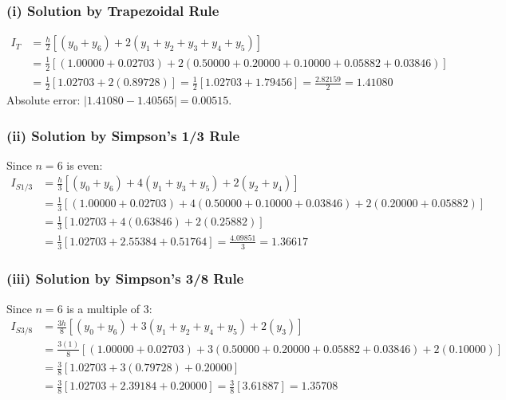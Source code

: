 \subsubsection*{(i) Solution by Trapezoidal Rule}
\begin{align}
    I_T &= \frac{h}{2} \left[ (y_0 + y_6) + 2(y_1 + y_2 + y_3 + y_4 + y_5) \right] \nonumber \\
    &= \frac{1}{2} \left[ (1.00000 + 0.02703) + 2(0.50000 + 0.20000 + 0.10000 + 0.05882 + 0.03846) \right] \nonumber \\
    &= \frac{1}{2} \left[ 1.02703 + 2(0.89728) \right] = \frac{1}{2} \left[ 1.02703 + 1.79456 \right] = \frac{2.82159}{2} = \boxed{1.41080}
\end{align}
Absolute error: $|1.41080 - 1.40565| = 0.00515$.

\subsubsection*{(ii) Solution by Simpson's 1/3 Rule}
Since $n = 6$ is even:
\begin{align}
    I_{S1/3} &= \frac{h}{3} \left[ (y_0 + y_6) + 4(y_1 + y_3 + y_5) + 2(y_2 + y_4) \right] \nonumber \\
    &= \frac{1}{3} \left[ (1.00000 + 0.02703) + 4(0.50000 + 0.10000 + 0.03846) + 2(0.20000 + 0.05882) \right] \nonumber \\
    &= \frac{1}{3} \left[ 1.02703 + 4(0.63846) + 2(0.25882) \right] \nonumber \\
    &= \frac{1}{3} \left[ 1.02703 + 2.55384 + 0.51764 \right] = \frac{4.09851}{3} = \boxed{1.36617}
\end{align}

\subsubsection*{(iii) Solution by Simpson's 3/8 Rule}
Since $n = 6$ is a multiple of 3:
\begin{align}
    I_{S3/8} &= \frac{3h}{8} \left[ (y_0 + y_6) + 3(y_1 + y_2 + y_4 + y_5) + 2(y_3) \right] \nonumber \\
    &= \frac{3(1)}{8} \left[ (1.00000 + 0.02703) + 3(0.50000 + 0.20000 + 0.05882 + 0.03846) + 2(0.10000) \right] \nonumber \\
    &= \frac{3}{8} \left[ 1.02703 + 3(0.79728) + 0.20000 \right] \nonumber \\
    &= \frac{3}{8} \left[ 1.02703 + 2.39184 + 0.20000 \right] = \frac{3}{8} [3.61887] = \boxed{1.35708}
\end{align}

